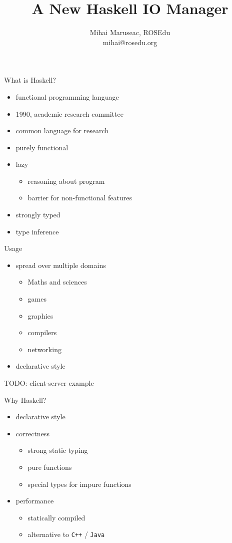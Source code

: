 \documentclass{beamer}
\title{A New Haskell IO Manager}
\author{Mihai Maruseac, ROSEdu\\mihai@rosedu.org}
\begin{document}
\maketitle

\begin{frame}{What is Haskell?}
  \begin{itemize}
    \item functional programming language
    \item 1990, academic research committee
    \item common language for research
    \pause
    \item purely functional
    \item lazy
    \begin{itemize}
      \item reasoning about program
      \item barrier for non-functional features
    \end{itemize}
    \pause
    \item strongly typed
    \item type inference
  \end{itemize}
\end{frame}

\begin{frame}{Usage}
  \begin{itemize}
    \item spread over multiple domains
    \begin{itemize}
      \item Maths and sciences
      \item games
      \item graphics
      \item compilers
      \item networking
    \end{itemize}
    \item declarative style
  \end{itemize}
  TODO: client-server example
\end{frame}

\begin{frame}{Why Haskell?}
  \begin{itemize}
    \item declarative style
    \pause
    \item correctness
    \begin{itemize}
      \item strong static typing
      \item pure functions
      \item special types for impure functions
    \end{itemize}
    \pause
    \item performance
    \begin{itemize}
      \item statically compiled
      \item alternative to \texttt{C++} / \texttt{Java}
    \end{itemize}
  \end{itemize}
\end{frame}
\end{document}
